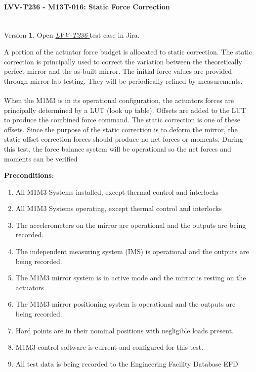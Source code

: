 \documentclass[SE,lsstdraft,STR,toc]{lsstdoc}
\providecommand{\tightlist}{
  \setlength{\itemsep}{0pt}\setlength{\parskip}{0pt}}
\begin{document}
\paragraph{ LVV-T236 - M13T-016: Static Force Correction }\mbox{}\\

Version \textbf{1}.
Open  \href{https://jira.lsstcorp.org/secure/Tests.jspa#/testCase/LVV-T236}{\textit{ LVV-T236 } }
test case in Jira.

A portion of the actuator force budget is allocated to static
correction. The static correction is principally used to correct the
variation between the theoretically perfect mirror and the as-built
mirror. The initial force values are provided through mirror lab
testing. They will be periodically refined by measurements.\\
\hspace*{0.333em}\\
When the M1M3 is in its operational configuration, the actuators forces
are principally determined by a LUT (look up table). Offsets are added
to the LUT to produce the combined force command. The static correction
is one of these offsets. Since the purpose of the static correction is
to deform the mirror, the static offset correction forces should produce
no net forces or moments. During this test, the force balance system
will be operational so the net forces and moments can be verified

\textbf{ Preconditions}:\\
\begin{enumerate}
\tightlist
\item
  All M1M3 Systems installed, except thermal control and interlocks
\item
  All M1M3 Systems operating, except thermal control and interlocks
\item
  The accelerometers on the mirror are operational and the outputs are
  being recorded.
\item
  The independent measuring system (IMS) is operational and the outputs
  are being recorded.
\item
  The M1M3 mirror system is in active mode and the mirror is resting on
  the actuators
\item
  The M1M3 mirror positioning system is operational and the outputs are
  being recorded.
\item
  Hard points are in their nominal positions with negligible loads
  present.
\item
  M1M3 control software is current and configured for this test.
\item
  All test data is being recorded to the Engineering Facility Database
  EFD
\end{enumerate}
\end{document}
